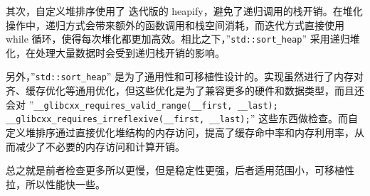 \documentclass{article}
\begin{document}
其次，自定义堆排序使用了 迭代版的 heapify，避免了递归调用的栈开销。在堆化操作中，递归方式会带来额外的函数调用和栈空间消耗，而迭代方式直接使用 while 循环，使得每次堆化都更加高效。相比之下，''\texttt{std::sort\_heap}'' 采用递归堆化，在处理大量数据时会受到递归栈开销的影响。

另外，''\texttt{std::sort\_heap}'' 是为了通用性和可移植性设计的。实现虽然进行了内存对齐、缓存优化等通用优化，但这些优化是为了兼容更多的硬件和数据类型，而且还会对 ''\texttt{\_\_glibcxx\_requires\_valid\_range(\_\_first, \_\_last);} \texttt{\_\_glibcxx\_requires\_irreflexive(\_\_first, \_\_last);}'' 这些东西做检查。而自定义堆排序通过直接优化堆结构的内存访问，提高了缓存命中率和内存利用率，从而减少了不必要的内存访问和计算开销。

总之就是前者检查更多所以更慢，但是稳定性更强，后者适用范围小，可移植性拉，所以性能快一些。
\end{document}
